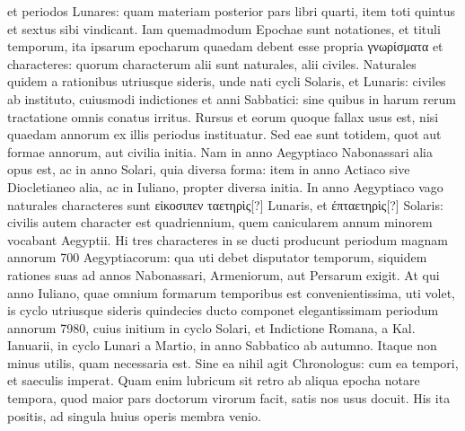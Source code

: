 et periodos Lunares: quam materiam posterior pars libri quarti,
item toti quintus et sextus sibi vindicant.
%
Iam quemadmodum Epochae
sunt notationes, et tituli temporum, ita ipsarum epocharum
quaedam debent esse propria \textgreek{γνωρίσματα} et characteres: quorum
characterum alii sunt naturales, alii civiles. 
Naturales quidem a rationibus
utriusque sideris, unde nati cycli Solaris, et Lunaris: civiles
ab instituto, cuiusmodi indictiones et anni Sabbatici: sine quibus in
harum rerum tractatione omnis conatus irritus. 
Rursus et eorum
quoque fallax usus est, nisi quaedam annorum ex illis periodus instituatur.
Sed eae sunt totidem, quot aut formae annorum, aut civilia
initia.
Nam in anno Aegyptiaco Nabonassari alia opus est, ac in anno
Solari, quia diversa forma: item in anno Actiaco sive Diocletianeo
alia, ac in Iuliano, propter diversa initia.
In anno Aegyptiaco vago
naturales characteres sunt \textgreek{εἰκοσιπεν ταετηρὶς[?]} Lunaris, et
\textgreek{έπταετηρὶς[?]} Solaris:
civilis autem character est quadriennium, quem canicularem
annum minorem vocabant Aegyptii.
Hi tres characteres in se ducti
producunt periodum magnam annorum 700 Aegyptiacorum: qua
uti debet disputator temporum, siquidem rationes suas ad annos
Nabonassari, Armeniorum, aut Persarum exigit.
At qui anno Iuliano,
quae omnium formarum temporibus est convenientissima, uti
volet, is cyclo utriusque sideris quindecies ducto componet elegantissimam
periodum annorum 7980, cuius initium in cyclo Solari,
et Indictione Romana, a Kal. Ianuarii, in cyclo Lunari a Martio, in
anno Sabbatico ab autumno.
Itaque non minus utilis, quam necessaria
est.
Sine ea nihil agit Chronologus: cum ea tempori, et saeculis
imperat.
Quam enim lubricum sit retro ab aliqua epocha notare tempora,
quod maior pars doctorum virorum facit, satis nos usus docuit.
His ita positis, ad singula huius operis membra venio.

